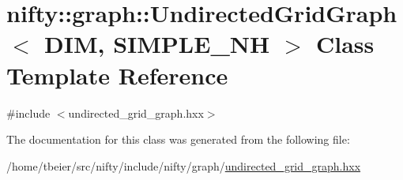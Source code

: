 \hypertarget{classnifty_1_1graph_1_1UndirectedGridGraph}{}\section{nifty\+:\+:graph\+:\+:Undirected\+Grid\+Graph$<$ D\+I\+M, S\+I\+M\+P\+L\+E\+\_\+\+N\+H $>$ Class Template Reference}
\label{classnifty_1_1graph_1_1UndirectedGridGraph}


{\ttfamily \#include $<$undirected\+\_\+grid\+\_\+graph.\+hxx$>$}



The documentation for this class was generated from the following file\+:\begin{DoxyCompactItemize}
\item 
/home/tbeier/src/nifty/include/nifty/graph/\hyperlink{graph_2undirected__grid__graph_8hxx}{undirected\+\_\+grid\+\_\+graph.\+hxx}\end{DoxyCompactItemize}
